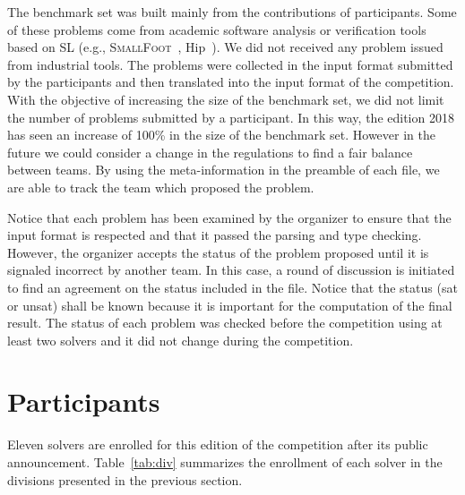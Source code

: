 \documentclass[orivec]{llncs}
\newcommand{\slcomp}{\textsf{SL-COMP}}
\begin{document}
The benchmark set was built mainly from the contributions of participants. 
Some of these problems come from academic software analysis or verification tools based on SL 
(e.g., \textsc{SmallFoot}~\cite{SmallFootsite}, \textsf{Hip}~\cite{ChinDNQ12}).
We did not received any problem issued from industrial tools.
The problems were collected in the input format submitted by the participants and
then translated into the input format of the competition.
With the objective of increasing the size of the benchmark set, we did not limit the
number of problems submitted by a participant. In this way, the edition 2018
has seen an increase of 100\% in the size of the benchmark set. However in the future 
we could consider a change in the regulations to find a fair balance between
teams. By using the meta-information in the preamble of each file, we
are able to track the team which proposed the problem.

Notice that each problem has been examined by the organizer to ensure that
the input format is respected and that it passed the parsing and
type checking. However, the organizer accepts the status of the problem proposed
until it is signaled incorrect by another team.
In this case, a round of discussion is initiated to find an agreement on the
status included in the file. Notice that the status (sat or unsat) 
shall be known because it is important for the computation of the final result.
The status of each problem was checked before the competition using at least two solvers 
and it did not change during the competition. 
 

\section{Participants}
\label{sec:solvers}

Eleven solvers are enrolled for this edition of the competition
after its public announcement. Table~\ref{tab:div} summarizes the enrollment
of each solver in the divisions presented in the previous section.

\end{document}
